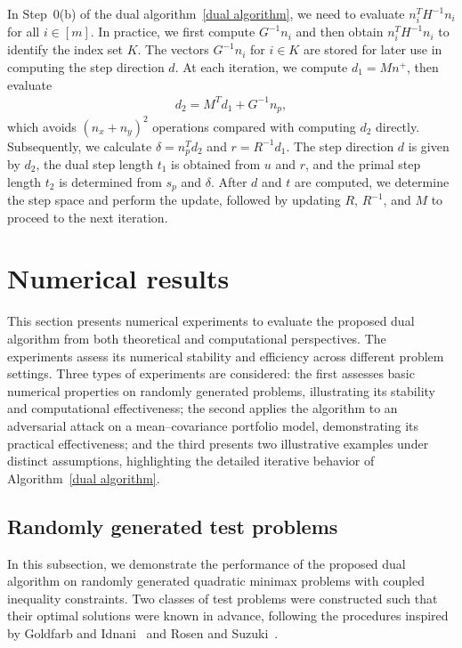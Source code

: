 \documentclass{article}
\begin{document}
	In Step~0(b) of the dual algorithm~\ref{dual algorithm}, we need to evaluate $n_{i}^{T}H^{-1}n_{i}$ for all $i \in [m]$.  
	In practice, we first compute $G^{-1}n_{i}$ and then obtain $n_{i}^{T}H^{-1}n_{i}$ to identify the index set $K$.  
	The vectors $G^{-1}n_{i}$ for $i \in K$ are stored for later use in computing the step direction $d$. At each iteration, we compute $d_{1} = Mn^{+}$, then evaluate
	\begin{align*}
	d_{2} = M^{T}d_{1} + G^{-1}n_{p},
	\end{align*}
	which avoids $(n_{x} + n_{y})^{2}$ operations compared with computing $d_{2}$ directly.  
	Subsequently, we calculate $\delta = n_{p}^{T}d_{2}$ and $r = R^{-1}d_{1}$.  
	The step direction $d$ is given by $d_{2}$, the dual step length $t_{1}$ is obtained from $u$ and $r$, and the primal step length $t_{2}$ is determined from $s_{p}$ and $\delta$.  
	After $d$ and $t$ are computed, we determine the step space and perform the update, followed by updating $R$, $R^{-1}$, and $M$ to proceed to the next iteration.
	
	\section{Numerical results}\label{section6}
	This section presents numerical experiments to evaluate the proposed dual algorithm from both theoretical and computational perspectives. The experiments assess its numerical stability and efficiency across different problem settings. Three types of experiments are considered: the first assesses basic numerical properties on randomly generated problems, illustrating its stability and computational effectiveness; the second applies the algorithm to an adversarial attack on a mean–covariance portfolio model, demonstrating its practical effectiveness; and the third presents two illustrative examples under distinct assumptions, highlighting the detailed iterative behavior of Algorithm~\ref{dual algorithm}.
	
	\subsection{Randomly generated test problems}
	In this subsection, we demonstrate the performance of the proposed dual algorithm on randomly generated quadratic minimax problems with coupled inequality constraints. Two classes of test problems were constructed such that their optimal solutions were known in advance, following the procedures inspired by Goldfarb and Idnani~\cite{goldfarbNumericallyStableDual1983} and Rosen and Suzuki~\cite{rosenPracniquesConstructionNonlinear1965}. 
	
\end{document}
